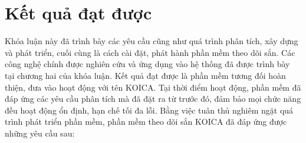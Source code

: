 \documentclass[./../main.tex]{subfiles}
\begin{document}
\section{Kết quả đạt được}
Khóa luận này đã trình bày các yêu cầu cũng như quá trình phân tích, xây dựng và phát triển, cuối cùng là cách cài đặt, phát hành phần mềm theo dõi sắn. Các công nghệ chính được nghiên cứu và ứng dụng vào hệ thống đã được trình bày tại chương hai của khóa luận. Kết quả đạt được là phần mềm tương đối hoàn thiện, đưa vào hoạt động với tên KOICA. Tại thời điểm hoạt động, phần mềm đã đáp ứng các yêu cầu phân tích mà đã đặt ra từ trước đó, đảm bảo mọi chức năng đều hoạt động ổn định, hạn chế tối đa lỗi.
Bằng việc tuân thủ nghiêm ngặt quá trình phát triển phần mềm, phần mềm theo dõi sắn KOICA đã đáp ứng được những yêu cầu sau: 
\end{document}
